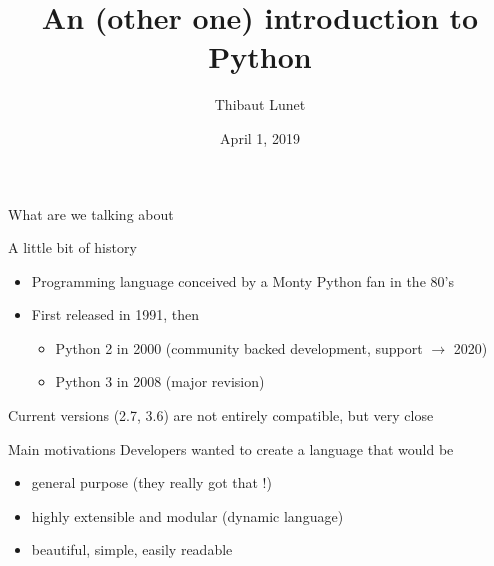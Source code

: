 \documentclass[11pt,unknownkeysallowed,usenames,dvipsnames]{beamer}
\title{An (other one) introduction to Python}
\author{Thibaut Lunet}
\date{April 1, 2019}
\begin{document}
	\maketitle
    
	\begin{frame}{What are we talking about}
        \begin{block}{A little bit of history}
            \begin{itemize}
            \item Programming language conceived by a Monty Python fan in the 80's
            \item First released in 1991, then
            \begin{itemize}
                \item Python 2 in 2000 (community backed development, support $\rightarrow$ 2020)
                \item Python 3 in 2008 (major revision)
            \end{itemize}
            \end{itemize}
            Current versions (2.7, 3.6) are not entirely compatible, 
            but very close
        \end{block}
        
        \begin{block}{Main motivations}
            Developers wanted to create a language that would be
            
            \vspace{-10pt}
            \begin{itemize}
                \item general purpose (they really got that !)
                \item highly extensible and modular (dynamic language)
                \item beautiful, simple, easily readable
               \end{itemize} 
        \end{block}
        
        \vspace*{-20pt}
	\end{frame}
    
\end{document}

